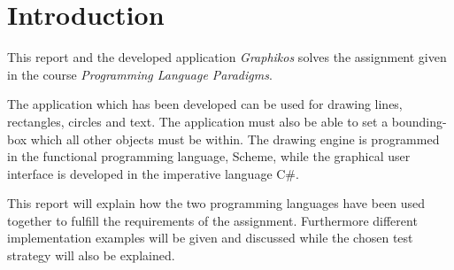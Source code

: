 \chapter{Introduction}
\label{chp:intro}

This report and the developed application \emph{Graphikos} solves the assignment given in the course \emph{Programming Language Paradigms}.

The application which has been developed can be used for drawing lines, rectangles, circles and text. The application must also be able to set a bounding-box which all other objects must be within. The drawing engine is programmed in the functional programming language, Scheme, while the graphical user interface is developed in the imperative language C\#. 

This report will explain how the two programming languages have been used together to fulfill the requirements of the assignment. Furthermore different implementation examples will be given and discussed while the chosen test strategy will also be explained.

